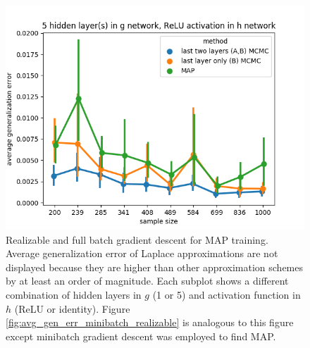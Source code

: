 \documentclass{article} %
\begin{document}
\begin{figure}[h]
\begin{center}
		\includegraphics[scale=0.4]{taskid11.png}
	\end{center}
	\caption{Realizable and full batch gradient descent for MAP training. Average generalization error of Laplace approximations are not displayed because they are higher than other approximation schemes by at least an order of magnitude. Each subplot shows a different combination of hidden layers in $g$ (1 or 5) and activation function in $h$ (ReLU or identity). Figure \ref{fig:avg_gen_err_minibatch_realizable} is analogous to this figure except minibatch gradient descent was employed to find MAP.}
	\label{fig:avg_gen_err_fullbatch_realizable}
\end{figure}

\begin{table}[h]%
	\centering
	\begin{tiny}
		\begin{subtable}[t]{2.5in}
			
			\caption{1 hidden layer(s) in $g$ network, identity activation in $h$ network}
		\end{subtable}
		\quad
		\begin{subtable}[t]{2.5in}
			
			\caption{5 hidden layer(s) in $g$ network, identity activation in $h$ network}
		\end{subtable}
		\quad
		\begin{subtable}[t]{2.5in}
			
			\caption{1 hidden layer(s) in $g$ network, ReLU activation in $h$ network}
		\end{subtable}
		\quad
		\begin{subtable}[t]{2.5in}
			
			\caption{5 hidden layer(s) in $g$ network, ReLU activation in $h$ network}
		\end{subtable}
	\end{tiny}
	\caption{Companion to Figure \ref{fig:avg_gen_err_fullbatch_realizable}.}%
	\label{table:avg_gen_err_fullbatch_realizable}%
\end{table}
\end{document}
